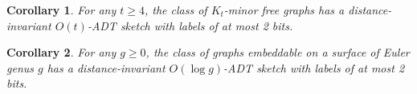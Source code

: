 \documentclass[11pt]{article}
\newtheorem{thm}{Theorem}[section]
\newtheorem{corollary}[thm]{Corollary}
\theoremstyle{definition}
\renewcommand{\le}{\leqslant}
\renewcommand{\ge}{\geqslant}
\def\F {{\mathcal F}}
\begin{document}
\begin{corollary}\label{cor:minor2}
For any $t\ge 4$, the class of  $K_t$-minor free graphs has a
distance-invariant $O(t)$-ADT sketch with labels of at most 2 bits.
\end{corollary}

\begin{corollary}\label{cor:genus}
For any $g\ge 0$, the class of  graphs embeddable on a surface of
Euler genus $g$ has  a distance-invariant $O(\log g)$-ADT sketch with labels of at most 2 bits.
\end{corollary}



 


\end{document}
